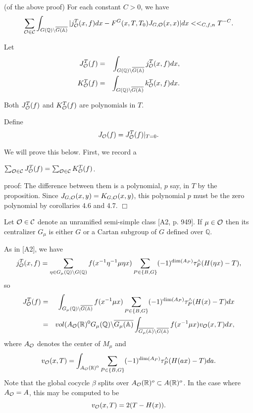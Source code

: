 \begin{corollary}
(of the above proof) For each constant $C>0$, we have 
\[
\sum_{{\cal{O}}\in {\cal{C}}}\int_{G({\mathbb{Q}})\backslash \overline{G(\mathbb{%
A})}}|j_{{\cal{O}}}^T(x,f)dx-F^G(x,T,T_0)J_{G,{\cal{O}}%
}(x,x)|dx<<_{C,f,n}T^{-C}. 
\]
\end{corollary}

Let 
\begin{eqnarray*}
J_{{\cal{O}}}^T(f) &=&\int_{G({\mathbb{Q}})\backslash \overline{G({\mathbb{A}})}}j_{%
{\cal{O}}}^T(x,f)dx, \\
K_{{\cal{O}}}^T(f) &=&\int_{G({\mathbb{Q}})\backslash \overline{G({\mathbb{A}})}}k_{%
{\cal{O}}}^T(x,f)dx.
\end{eqnarray*}

\begin{proposition}
Both $
J_{{\cal{O}}}^T(f)
$ and $K_{{\cal{O}}}^T(f)$ are polynomials in
$T$.
\end{proposition}

Define
\begin{equation}
J_{{\cal{O}}}(f)
=J_{{\cal{O}}}^T(f)|_{T=0}.
\end{equation}

We will prove this below. First, we record a

\begin{corollary}
$\sum_{{\cal{O}}\in {\cal{C}}}J_{{\cal{O}}}^T(f)=\sum_{{\cal{O}}\in 
{\cal{C}}}K_{{\cal{O}}}^T(f)$.
\end{corollary}

proof: The difference between them is a polynomial, $p$ say, in $T$ by the
proposition. Since $J_{G,{\cal{O}}}(x,y)=K_{G,{\cal{O}}}(x,y)$, this
polynomial $p$ must be the zero polynomial by corollaries 4.6 
and 4.7. $\Box $

Let ${\cal{O}}\in {\cal{C}}$ denote an unramified semi-simple class [A2,
p. 949]. If $\mu \in {\cal{O}}$ then its centralizer $G_\mu $ is either $G$
or a Cartan subgroup of $G$ defined over ${\mathbb{Q}}$.

As in [A2], we have 
\begin{equation}
j_{{\cal{O}}}^T(x,f)=
\sum_{\eta \in G_\mu ({\mathbb{Q}})\backslash G({\mathbb{Q}})}
f(x^{-1}\eta ^{-1}\mu \eta x)\sum_{P\in \{B,G\}}(-1)^{\dim (A_P)}
\tau_P^{\wedge }(H(\eta x)-T),
\end{equation}
so 
\begin{eqnarray}
J_{{\cal{O}}}^T(f)
&=&\int_{G_\mu ({\mathbb{Q}})\backslash \overline{G({\mathbb{A}})}}
f(x^{-1}\mu x)\sum_{P\in \{B,G\}}(-1)^{\dim (A_P)}
\tau _P^{\wedge}(H(x)-T)dx \\
&=&vol(A_{{\cal{O}}}({\mathbb{R}})^0G_\mu ({\mathbb{Q}})
\backslash \overline{G_\mu ({\mathbb{A}})}
\int_{\overline{G_\mu ({\mathbb{A}})}\backslash \overline{G({\mathbb{A}})}}
f(x^{-1}\mu x)v_{{\cal{O}}}(x,T)dx,  \nonumber
\end{eqnarray}
where $A_{{\cal{O}}}$ denotes the center of $M_\mu $ and 
\[
v_{{\cal{O}}}(x,T)
=\int_{A_{{\cal{O}}}({\mathbb{R}})^0}\sum_{P\in
\{B,G\}}(-1)^{\dim (A_P)}\tau _P^{\wedge }(H(ax)-T)da. 
\]
Note that the global cocycle $\beta $ splits over
$A_{{\cal{O}}}({\mathbb{R}})^o\subset A({\mathbb{R}})^o$.
In the case where $A_{\cal{O}}=A$, this may be
computed to be 
\[
v_{{\cal{O}}}(x,T)=2(T-H(x)). 
\]

